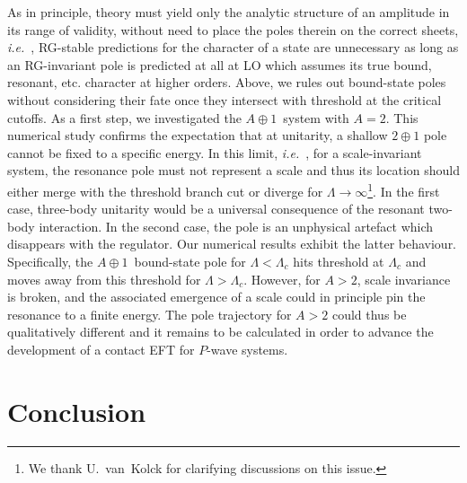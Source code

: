 \documentclass[preprint,12pt]{elsarticle}
\newcommand{\lc}{\ensuremath{\Lambda_c}}
\newcommand{\abb}{\mbox{\ensuremath{A\oplus 1}}}
\newcommand{\ie}{\textit{i.e.}~}
\begin{document}
%
As in principle, theory must yield only the analytic structure of an amplitude in its range of validity,
without need to place the poles therein on the correct sheets, \ie,
RG-stable predictions for the character of a state are unnecessary as long as an RG-invariant pole
is predicted at all at LO which assumes its true bound, resonant, etc. character at higher orders. 
Above, we rules out bound-state poles without considering their fate once they intersect with threshold
at the critical cutoffs.
As a first step, we investigated the \abb~system with $A=2$.
This numerical study confirms the expectation
that at unitarity, a shallow $2\oplus1$ pole cannot be fixed to a specific energy.
In this limit, \ie, for a scale-invariant system, the resonance pole must not represent a scale and thus its location should either
merge with the threshold branch cut or diverge for $\Lambda\to\infty$\footnote{We thank U.~van~Kolck for clarifying discussions on this issue.}.
In the first case, three-body unitarity would be a universal consequence of the resonant two-body interaction. 
In the second case, the pole is an unphysical artefact which disappears with the regulator.
Our numerical results exhibit the latter behaviour. Specifically, the \abb~bound-state pole for $\Lambda<\lc$ hits threshold at $\lc$ and
moves away from this threshold for $\Lambda>\lc$.
However, for $A>2$, scale invariance is broken, and the associated emergence of a scale could in principle
pin the resonance to a finite energy. The pole trajectory for $A>2$ could thus be qualitatively different and
it remains to be calculated in order to advance the development of a contact EFT for $P$-wave systems.




\section*{Conclusion}
\end{document}
